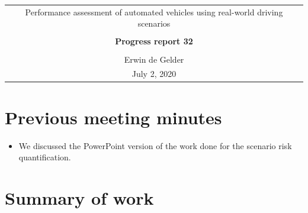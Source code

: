 \documentclass[10pt,final,a4paper,oneside,onecolumn]{article}
\newcommand{\progressreportnumber}{32}
\renewcommand{\author}{Erwin de Gelder}
\renewcommand{\date}{July 2, 2020}
\renewcommand{\title}{Performance assessment of automated vehicles using real-world driving scenarios}
\begin{document}
	
\begin{center}
	\begin{tabular}{c}
		\title \\ \\
		\textbf{\huge Progress report \progressreportnumber} \\ \\
		\author \\ 
		\date
	\end{tabular}
\end{center}

\section{Previous meeting minutes}

\begin{itemize}
	\item We discussed the PowerPoint version of the work done for the scenario risk quantification.
\end{itemize}

\section{Summary of work}
\end{document}
